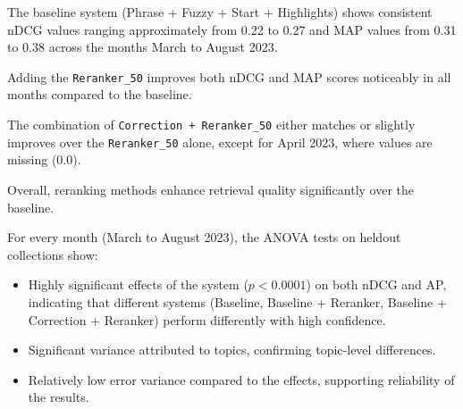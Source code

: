 The baseline system (Phrase + Fuzzy + Start + Highlights) shows consistent nDCG values ranging approximately from 0.22 to 0.27 and MAP values from 0.31 to 0.38 across the months March to August 2023.

Adding the \texttt{Reranker\_50} improves both nDCG and MAP scores noticeably in all months compared to the baseline.

The combination of \texttt{Correction + Reranker\_50} either matches or slightly improves over the \texttt{Reranker\_50} alone, except for April 2023, where values are missing (0.0).

Overall, reranking methods enhance retrieval quality significantly over the baseline.

For every month (March to August 2023), the ANOVA tests on heldout collections show:

\begin{itemize}
    \item Highly significant effects of the system ($p < 0.0001$) on both nDCG and AP, indicating that different systems (Baseline, Baseline + Reranker, Baseline + Correction + Reranker) perform differently with high confidence.
    \item Significant variance attributed to topics, confirming topic-level differences.
    \item Relatively low error variance compared to the effects, supporting reliability of the results.
\end{itemize}
